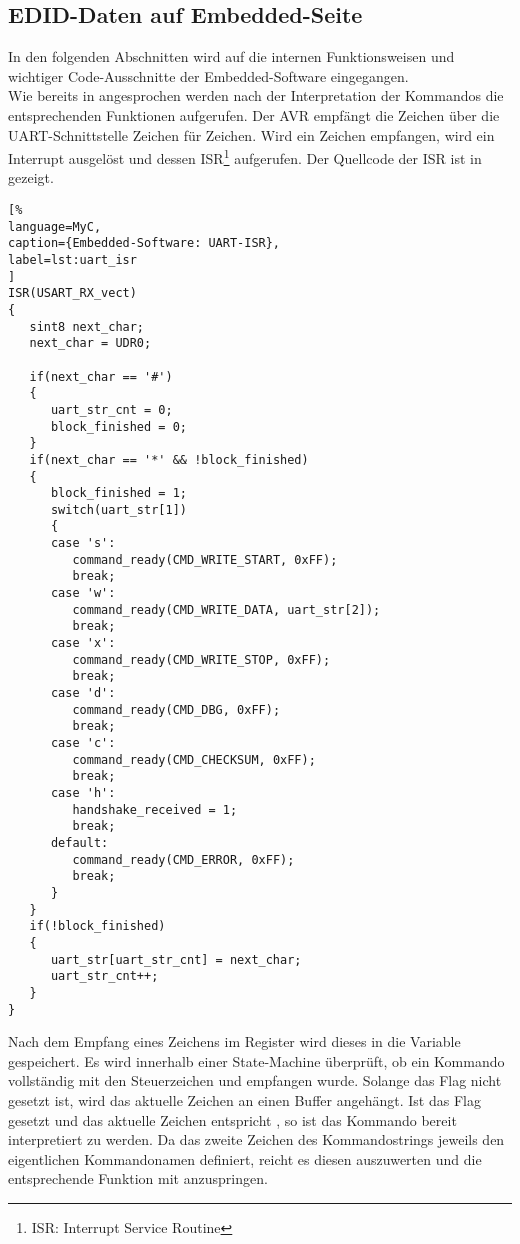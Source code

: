 \subsection{EDID-Daten auf Embedded-Seite}
In den folgenden Abschnitten wird auf die  internen Funktionsweisen und wichtiger Code-Ausschnitte der Embedded-Software eingegangen.\\
Wie bereits in  angesprochen werden nach der Interpretation der Kommandos die entsprechenden Funktionen aufgerufen. Der AVR empfängt die Zeichen über die UART-Schnittstelle Zeichen für Zeichen. Wird ein Zeichen empfangen, wird ein Interrupt ausgelöst und dessen ISR\footnote{ISR: Interrupt Service Routine} aufgerufen. Der Quellcode der ISR ist in  gezeigt.
\begin{lstlisting}[%
language=MyC,
caption={Embedded-Software: UART-ISR},
label=lst:uart_isr
]
ISR(USART_RX_vect)
{
   sint8 next_char;
   next_char = UDR0;

   if(next_char == '#')
   {
      uart_str_cnt = 0;
      block_finished = 0;
   }
   if(next_char == '*' && !block_finished)
   {
      block_finished = 1;
      switch(uart_str[1])
      {
      case 's':
         command_ready(CMD_WRITE_START, 0xFF);
         break;
      case 'w':
         command_ready(CMD_WRITE_DATA, uart_str[2]);
         break;
      case 'x':
         command_ready(CMD_WRITE_STOP, 0xFF);
         break;
      case 'd':
         command_ready(CMD_DBG, 0xFF);
         break;
      case 'c':
         command_ready(CMD_CHECKSUM, 0xFF);
         break;
      case 'h':
         handshake_received = 1;
         break;
      default:
         command_ready(CMD_ERROR, 0xFF);
         break;
      }
   }
   if(!block_finished)
   {
      uart_str[uart_str_cnt] = next_char;
      uart_str_cnt++;
   }
}
\end{lstlisting}
Nach dem Empfang eines Zeichens im Register  wird dieses in die Variable  gespeichert. Es wird innerhalb einer State-Machine überprüft, ob ein Kommando vollständig mit den Steuerzeichen \code{\#} und \code{\*} empfangen wurde. Solange das Flag  nicht gesetzt ist, wird das aktuelle Zeichen an einen Buffer  angehängt. Ist das Flag  gesetzt und das aktuelle Zeichen entspricht \code{\*}, so ist das Kommando bereit interpretiert zu werden. Da das zweite Zeichen des Kommandostrings  jeweils den eigentlichen Kommandonamen definiert, reicht es diesen auszuwerten und die entsprechende Funktion mit  anzuspringen.
